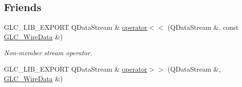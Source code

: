 \subsection*{Friends}
\begin{DoxyCompactItemize}
\item 
G\-L\-C\-\_\-\-L\-I\-B\-\_\-\-E\-X\-P\-O\-R\-T Q\-Data\-Stream \& \hyperlink{class_g_l_c___wire_data_a38b8e8fd4ba763ef856750a365ee060f}{operator$<$$<$} (Q\-Data\-Stream \&, const \hyperlink{class_g_l_c___wire_data}{G\-L\-C\-\_\-\-Wire\-Data} \&)
\begin{DoxyCompactList}\small\item\em Non-\/member stream operator. \end{DoxyCompactList}\item 
G\-L\-C\-\_\-\-L\-I\-B\-\_\-\-E\-X\-P\-O\-R\-T Q\-Data\-Stream \& \hyperlink{class_g_l_c___wire_data_a842142cd21febf6ade78440aa10e6aa0}{operator$>$$>$} (Q\-Data\-Stream \&, \hyperlink{class_g_l_c___wire_data}{G\-L\-C\-\_\-\-Wire\-Data} \&)
\end{DoxyCompactItemize}
